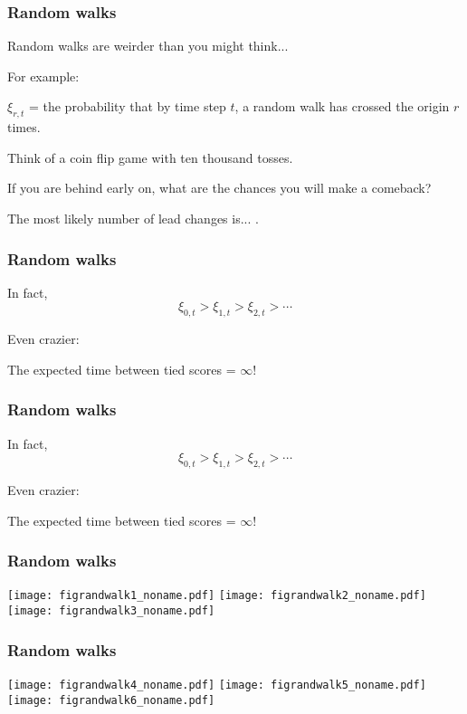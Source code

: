 \begin{frame}
  \frametitle{Random walks}

  Random walks are weirder than you might think...

  For example:

  $\xi_{r,t}$ = the probability that by time step $t$,
  a random walk has crossed the origin $r$ times.

  Think of a coin flip game with ten thousand tosses.

  If you are behind early on, what are the chances you
  will make a comeback?

  The most likely number of lead changes is...  
  .


\end{frame}

\begin{frame}
  \frametitle{Random walks}

  In fact,
  $$\xi_{0,t} > \xi_{1,t} > \xi_{2,t} > \cdots $$

  \inv 

  Even crazier:

  The expected time between tied scores = $\infty$!

\end{frame}

\begin{frame}
  \frametitle{Random walks}

  In fact,
  $$\xi_{0,t} > \xi_{1,t} > \xi_{2,t} > \cdots $$

  Even crazier:

  The expected time between tied scores = $\infty$!

\end{frame}

\begin{frame}
  \frametitle{Random walks}

  \texttt{[image: figrandwalk1\_noname.pdf]}
  \texttt{[image: figrandwalk2\_noname.pdf]}
  \texttt{[image: figrandwalk3\_noname.pdf]}

\end{frame}

\begin{frame}
  \frametitle{Random walks}

  \texttt{[image: figrandwalk4\_noname.pdf]}
  \texttt{[image: figrandwalk5\_noname.pdf]}
  \texttt{[image: figrandwalk6\_noname.pdf]}

\end{frame}

